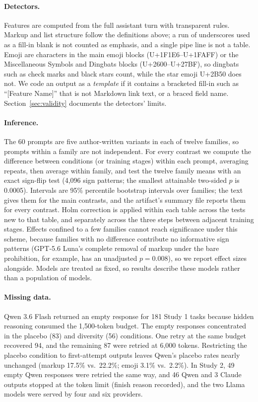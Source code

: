 \documentclass[acmsmall,screen,review,anonymous]{acmart}
\begin{document}
\paragraph{Detectors.} Features are computed from the full assistant turn with transparent rules. Markup and list structure follow the definitions above; a run of underscores used as a fill-in blank is not counted as emphasis, and a single pipe line is not a table. Emoji are characters in the main emoji blocks (U+1F1E6--U+1FAFF) or the Miscellaneous Symbols and Dingbats blocks (U+2600--U+27BF), so dingbats such as check marks and black stars count, while the star emoji U+2B50 does not. We code an output as a \emph{template} if it contains a bracketed fill-in such as ``[Feature Name]'' that is not Markdown link text, or a braced field name. Section~\ref{sec:validity} documents the detectors' limits.

\paragraph{Inference.} The 60 prompts are five author-written variants in each of twelve families, so prompts within a family are not independent. For every contrast we compute the difference between conditions (or training stages) within each prompt, averaging repeats, then average within family, and test the twelve family means with an exact sign-flip test (4,096 sign patterns; the smallest attainable two-sided $p$ is 0.0005). Intervals are 95\% percentile bootstrap intervals over families; the text gives them for the main contrasts, and the artifact's summary file reports them for every contrast. Holm correction is applied within each table across the tests new to that table, and separately across the three steps between adjacent training stages. Effects confined to a few families cannot reach significance under this scheme, because families with no difference contribute no informative sign patterns (GPT-5.6 Luna's complete removal of markup under the bare prohibition, for example, has an unadjusted $p=0.008$), so we report effect sizes alongside. Models are treated as fixed, so results describe these models rather than a population of models.

\paragraph{Missing data.} Qwen 3.6 Flash returned an empty response for 181 Study 1 tasks because hidden reasoning consumed the 1,500-token budget. The empty responses concentrated in the placebo (83) and diversity (56) conditions. One retry at the same budget recovered 94, and the remaining 87 were retried at 6,000 tokens. Restricting the placebo condition to first-attempt outputs leaves Qwen's placebo rates nearly unchanged (markup 17.5\% vs.\ 22.2\%; emoji 3.1\% vs.\ 2.2\%). In Study 2, 49 empty Qwen responses were retried the same way, and 46 Qwen and 3 Claude outputs stopped at the token limit (finish reason recorded), and the two Llama models were served by four and six providers.
\end{document}

